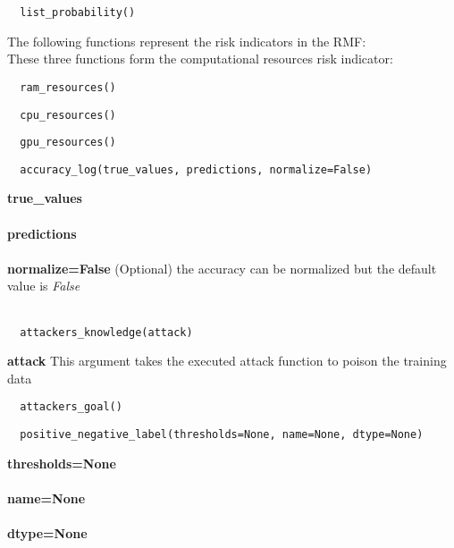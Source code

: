 \begin{lstlisting}
  list_probability()
\end{lstlisting}

The following functions represent the risk indicators in the RMF: \\
These three functions form the computational resources risk indicator: \\
\begin{lstlisting}
  ram_resources()
\end{lstlisting}

\begin{lstlisting}
  cpu_resources()
\end{lstlisting}

\begin{lstlisting}
  gpu_resources()
\end{lstlisting}

\begin{lstlisting}
  accuracy_log(true_values, predictions, normalize=False)
\end{lstlisting}

\noindent\textbf{true\_values}
\\ \\
\textbf{predictions}
\\ \\
\textbf{normalize=False}
(Optional) the accuracy can be normalized but the default value is \textit{False} \\ \\

\begin{lstlisting}
  attackers_knowledge(attack)
\end{lstlisting}

\noindent\textbf{attack}
This argument takes the executed attack function to poison the training data \\

\begin{lstlisting}
  attackers_goal()
\end{lstlisting}

\begin{lstlisting}
  positive_negative_label(thresholds=None, name=None, dtype=None)
\end{lstlisting}

\noindent\textbf{thresholds=None}
\\ \\
\textbf{name=None}
\\ \\
\textbf{dtype=None}
\\ \\

